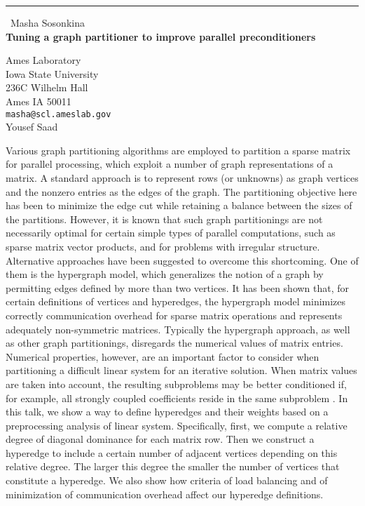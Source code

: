 \documentclass{report}
\begin{document}
\begin{center}
\rule{6in}{1pt} \
{\large Masha Sosonkina \\
{\bf Tuning a graph partitioner to improve parallel preconditioners}}

Ames Laboratory \\ Iowa State University \\ 236C Wilhelm Hall \\ Ames IA 50011
\\
{\tt masha@scl.ameslab.gov}\\
Yousef Saad\end{center}

Various graph partitioning algorithms are employed to partition a
sparse matrix for parallel processing, which exploit a number of graph
representations of a matrix. A standard approach is to represent rows
(or unknowns) as graph vertices and the nonzero entries as the edges
of the graph. The partitioning objective here has been to minimize the
edge cut while retaining a balance between the sizes of the
partitions. However, it is known \cite{hendrickson00graph} that such
graph partitionings are not necessarily optimal for certain simple
types of parallel computations, such as sparse matrix vector
products, and for problems with irregular structure.
Alternative approaches have been suggested to overcome this
shortcoming.
One of them is the hypergraph model, which generalizes the notion of a
graph by permitting edges defined by more than two vertices.
It has been shown that, for certain definitions of vertices and
hyperedges, the hypergraph model minimizes correctly
communication overhead for sparse matrix operations and
represents adequately non-symmetric matrices. Typically the
hypergraph approach, as well as other graph partitionings, disregards
the numerical values of matrix entries.
Numerical properties, however, are an important factor to
consider when partitioning a difficult linear system for an iterative
solution.
When matrix values are taken into account, the resulting subproblems may
be better conditioned if, for example, all strongly coupled coefficients
reside in the same subproblem \cite{saad-sosonkina-acpc99}. In this
talk, we show a way to define hyperedges and their weights based
on a preprocessing analysis of linear system. Specifically, first, we
compute a relative degree of diagonal dominance for each matrix
row. Then we construct a hyperedge to include a certain number of
adjacent vertices depending on this relative degree. The larger this
degree the smaller the number of vertices that constitute a
hyperedge. We also show how criteria of load
balancing and of minimization of communication overhead affect our
hyperedge definitions.
\end{document}
